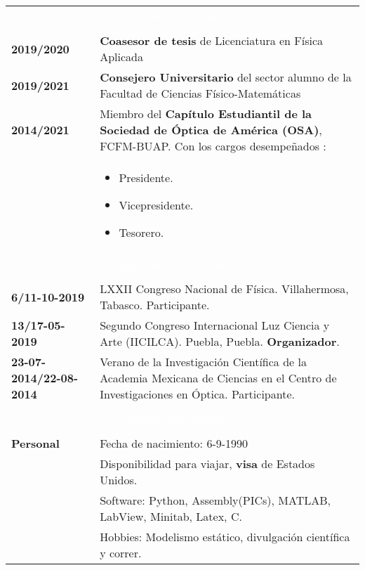 \documentclass[twoside,letter,openright,10pt]{report}
\begin{document}
\begin{table}[hbt!]
\begin{tabular}{p{40mm}p{140mm}}
\\
\multicolumn{2}{c}{\cellcolor{black} \textcolor{white}{Experiencia Laboral}}
\\
\\
\textbf{2019/2020} & \textbf{Coasesor de tesis} de Licenciatura en Física Aplicada
\\
\textbf{2019/2021} & \textbf{Consejero Universitario} del sector alumno de la Facultad de Ciencias Físico-Matemáticas
\\
\textbf{2014/2021} & Miembro del \textbf{Capítulo Estudiantil de la Sociedad de Óptica de América (OSA)}, FCFM-BUAP. Con los cargos desempeñados :\\
& \vspace{-2mm} \begin{itemize}[noitemsep,nolistsep]
\item Presidente.
\item Vicepresidente.
\item Tesorero.
\vspace{-4mm}
\end{itemize}
\\
\multicolumn{2}{c}{\cellcolor{black} \textcolor{white}{Experiencia Universitaria}}
\\
\\
\textbf{6/11-10-2019} &LXXII Congreso Nacional de Física. Villahermosa, Tabasco. Participante.
\\
\textbf{13/17-05-2019} &Segundo Congreso Internacional Luz Ciencia y Arte (IICILCA). Puebla, Puebla. \textbf{Organizador}.
\\
\textbf{23-07-2014/22-08-2014} & Verano de la Investigación Científica de la Academia Mexicana de Ciencias en el Centro de Investigaciones en Óptica. Participante.
\\
\\
\multicolumn{2}{c}{\cellcolor{black} \textcolor{white}{Información Adicional}}
\\
\\
\textbf{Personal} &  Fecha de nacimiento: 6-9-1990
\\
& Disponibilidad para viajar, \textbf{visa} de Estados Unidos.
\\
& Software: Python, Assembly(PICs), MATLAB, LabView, Minitab, Latex, C.
\\
& Hobbies: Modelismo estático, divulgación científica y correr.
\\

\end{tabular}
\end{table}
\end{document}
